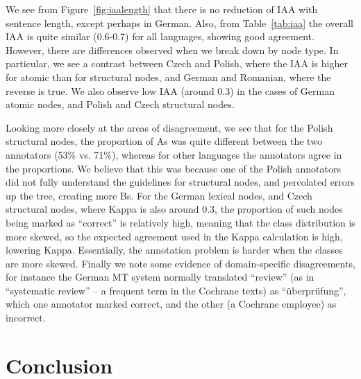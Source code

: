 \documentclass[11pt]{article}
\newcommand{\figref}[1]{Figure~\ref{#1}}
\newcommand{\tabref}[1]{Table~\ref{#1}}
\begin{document}
We see from \figref{fig:iaalength} that there is no reduction of IAA with sentence
length, except perhaps in German. Also, from \tabref{tab:iaa} the overall IAA
is quite similar (0.6-0.7) for all languages, showing good agreement.
However, there are differences observed when we break down by node type.
In particular, we see a contrast  between
Czech and Polish, where the IAA is higher for atomic than for structural nodes, and German and Romanian,
where the reverse is true. We also observe low IAA (around 0.3) in the cases of
German atomic nodes, and Polish and Czech structural nodes.

Looking more closely at the areas of disagreement, we see that for the Polish structural nodes, the 
proportion of As was quite different between the two annotators (53\% vs. 71\%), whereas for other
languages the annotators agree in the proportions. We believe that this was because one of the Polish
annotators did not fully understand the guidelines for structural nodes, and percolated
errors up the tree, creating more Bs. For the German lexical nodes, and Czech structural nodes, where
Kappa is also around 0.3, the proportion of such nodes being marked as ``correct'' is relatively 
high, meaning that the class distribution is more skewed, so the expected agreement used in the
Kappa calculation is high, lowering Kappa. Essentially, the annotation problem is harder when the classes
are more skewed. Finally we note some evidence of domain-specific disagreements, for instance the German
MT system normally translated ``review'' (as in ``systematic review'' -- a frequent term in the 
Cochrane texts) as ``\"uberpr\"ufung'', which 
one annotator marked correct, and the other (a Cochrane employee)  as incorrect.





\section{Conclusion}\label{sec:conclusion}
\end{document}
